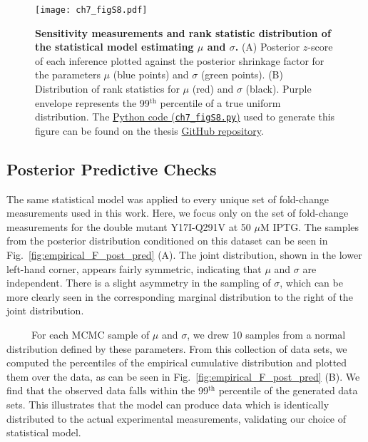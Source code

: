 \documentclass[12pt]{caltech_thesis}
\begin{document}
\hypertarget{fig:empirical_F_sensitivity}{%
\begin{figure}
\centering
\texttt{[image: ch7\_figS8.pdf]}
\caption[{Sensitivity measurements and rank statistic distribution of
the statistical model estimating \(\mu\) and
\(\sigma\).}]{\textbf{Sensitivity measurements and rank statistic
distribution of the statistical model estimating \(\mu\) and
\(\sigma\).} (A) Posterior \(z\)-score of each inference plotted against
the posterior shrinkage factor for the parameters \(\mu\) (blue points)
and \(\sigma\) (green points). (B) Distribution of rank statistics for
\(\mu\) (red) and \(\sigma\) (black). Purple envelope represents the
99\(^\text{th}\) percentile of a true uniform distribution. The
\href{https://github.com/gchure/phd/blob/master/src/chapter_07/code/ch7_figS8.py}{Python
code (\texttt{ch7\_figS8.py})} used to generate this figure can be found
on the thesis \href{https://github.com/gchure/phd}{GitHub repository}.}
\label{fig:empirical_F_sensitivity}
\end{figure}
}

\hypertarget{posterior-predictive-checks}{%
\subsection{Posterior Predictive
Checks}\label{posterior-predictive-checks}}

The same statistical model was applied to every unique set of
fold-change measurements used in this work. Here, we focus only on the
set of fold-change measurements for the double mutant Y17I-Q291V at 50
\(\mu\)M IPTG. The samples from the posterior distribution conditioned
on this dataset can be seen in Fig.~\ref{fig:empirical_F_post_pred} (A).
The joint distribution, shown in the lower left-hand corner, appears
fairly symmetric, indicating that \(\mu\) and \(\sigma\) are
independent. There is a slight asymmetry in the sampling of \(\sigma\),
which can be more clearly seen in the corresponding marginal
distribution to the right of the joint distribution.

~~~~~For each MCMC sample of \(\mu\) and \(\sigma\), we drew 10 samples
from a normal distribution defined by these parameters. From this
collection of data sets, we computed the percentiles of the empirical
cumulative distribution and plotted them over the data, as can be seen
in Fig.~\ref{fig:empirical_F_post_pred} (B). We find that the observed
data falls within the 99\(^\text{th}\) percentile of the generated data
sets. This illustrates that the model can produce data which is
identically distributed to the actual experimental measurements,
validating our choice of statistical model.
\end{document}
